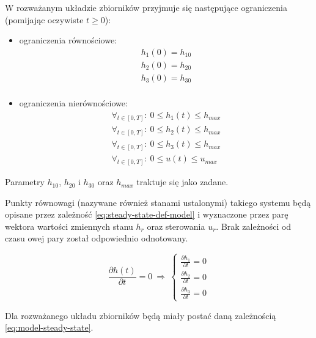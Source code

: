 W rozważanym układzie zbiorników przyjmuje się następujące ograniczenia (pomijając oczywiste $t \geq 0$):
\begin{itemize}
    \item ograniczenia równościowe:
    \begin{equation}\label{eq:model-eq-const}
    \begin{array}{lr}
        h_{1}(0) = h_{10}\\
        h_{2}(0) = h_{20}\\
        h_{3}(0) = h_{30}\\
    \end{array}
    \end{equation}
    \item ograniczenia nierównościowe:
    \begin{equation}\label{eq:model-noneq-const}
    \begin{array}{lr}
        \forall_{t \in [0, T]}:~ 0 \leq h_{1}(t) \leq h_{max}\\
        \forall_{t \in [0, T]}:~ 0 \leq h_{2}(t) \leq h_{max}\\
        \forall_{t \in [0, T]}:~ 0 \leq h_{3}(t) \leq h_{max}\\
        \forall_{t \in [0, T]}:~ 0 \leq u(t) \leq u_{max}
    \end{array}
    \end{equation}
\end{itemize}
Parametry $h_{10}$, $h_{20}$ i $h_{30}$ oraz $h_{max}$ traktuje się jako zadane.

Punkty równowagi (nazywane również stanami ustalonymi) takiego systemu będą opisane przez zależność \ref{eq:steady-state-def-model} i wyznaczone przez parę wektora wartości zmiennych stanu $h_{r}$ oraz sterowania $u_{r}$. Brak zależności od czasu owej pary został odpowiednio odnotowany.

\begin{equation}\label{eq:steady-state-def-model}
\frac{\partial h(t)}{\partial t} = 0 ~\Rightarrow~ 
\left \{
\begin{array}{lr}
    \frac{\partial h_{1}}{\partial t} = 0 \\
    \frac{\partial h_{2}}{\partial t} = 0 \\
    \frac{\partial h_{3}}{\partial t} = 0
\end{array}
\right.
\end{equation}

Dla rozważanego układu zbiorników będą miały postać daną zależnością \ref{eq:model-steady-state}.

